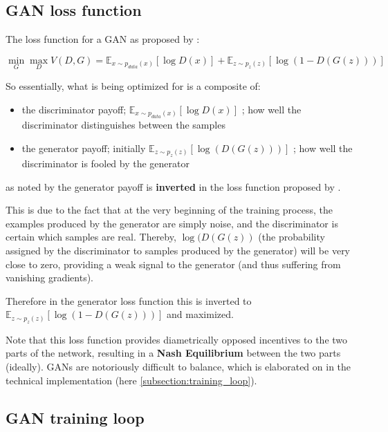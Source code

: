 \pagebreak

\subsection{GAN loss function}

The loss function for a \ac{GAN} as proposed by \cite{goodfellow2014generative}:

$$\min_G \max_D V(D, G)=
\mathbb{E}_{x\sim p_{data}(x)}[\log D(x)]
+ \mathbb{E}_{z\sim p_z(z)}[\log(1 - D(G(z)))]$$

So essentially, what is being optimized for is a composite of:

\begin{itemize}
	\item the discriminator payoff; $\mathbb{E}_{x\sim p_{data}(x)}[\log D(x)]$ ; how well the discriminator distinguishes between the samples
	\item the generator payoff; initially $\mathbb{E}_{z\sim p_z(z)}[\log(D(G(z)))]$ ; how well the discriminator is fooled by the generator
\end{itemize}

as noted by \cite{raschka2017python} the generator payoff is \textbf{inverted} in the loss function proposed by \cite{goodfellow2014generative}. 

This is due to the fact that at the very beginning of the training process, the examples produced by the generator are simply noise, and the discriminator is certain which samples are real. Thereby, $\log(D(G(z))$ (the probability assigned by the discriminator to samples produced by the generator) will be very close to zero, providing a weak signal to the generator (and thus suffering from vanishing gradients). 

Therefore in the generator loss function this is inverted to $\mathbb{E}_{z\sim p_z(z)}[\log(1 - D(G(z)))]$ and maximized.

Note that this loss function provides diametrically opposed incentives to the two parts of the network, resulting in a \textbf{Nash Equilibrium} between the two parts (ideally).
\acp{GAN} are notoriously difficult to balance, which is elaborated on in the technical implementation (here \ref{subsection:training_loop}).

\pagebreak

\subsection{GAN training loop}

